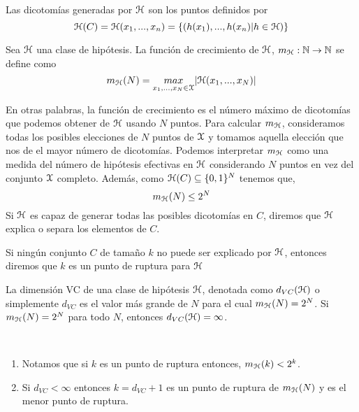      \begin{definicion} 
     Las dicotomías generadas por $\mathcal{H}$ son los puntos definidos por 
     \begin{equation}
     \mathcal{H}(C) = \mathcal{H}(x_1,...,x_n) = \{(h(x_1),...,h(x_n) | h \in \mathcal{H})\}
     \end{equation}
     \end{definicion}
     
     \begin{definicion}
     Sea $\mathcal{H}$ una clase de hipótesis. La función de crecimiento de $\mathcal{H}$, $m_{\mathcal{H}}:\mathbb{N} \to \mathbb{N}$ se define como 
     \begin{equation}
     m_{\mathcal{H}}(N) = \underset{x_1,...,x_N \in \mathcal{X}}{max} |\mathcal{H}(x_1,...,x_N)|
     \end{equation}
     \end{definicion}
     
     En otras palabras, la función de crecimiento es el número máximo de dicotomías que podemos obtener de $\mathcal{H}$ usando $N$ puntos. Para calcular $m_{\mathcal{H}}$, consideramos todas los posibles elecciones de $N$ puntos de $\mathcal{X}$ y tomamos aquella elección que nos de el mayor número de dicotomías. Podemos interpretar $m_{\mathcal{H}}$ como una medida del número de hipótesis efectivas en $\mathcal{H}$ considerando $N$ puntos en vez del conjunto $\mathcal{X}$ completo. Además, como $\mathcal{H}(C) \subseteq \{0,1\}^N$ tenemos que,
     $$m_{\mathcal{H}}(N) \leq 2^N$$
     Si $\mathcal{H}$ es capaz de generar todas las posibles dicotomías en $C$, diremos que $\mathcal{H}$ explica o separa los elementos de $C$. \\
     
    \begin{definicion}
    Si ningún conjunto $C$ de tamaño $k$ no puede ser explicado por $\mathcal{H}$, entonces diremos que $k$ es un punto de ruptura para $\mathcal{H}$
    \end{definicion}
    
    
    \begin{definicion}\label{def:VC}
    La dimensión VC de una clase de hipótesis $\mathcal{H}$, denotada como $d_{VC}(\mathcal{H})$ o simplemente $d_{VC}$ es el valor más grande de $N$ para el cual $m_{\mathcal{H}}(N) = 2^N$. Si $m_{\mathcal{H}}(N) = 2^N$ para todo $N$, entonces $d_{VC}(\mathcal{H}) = \infty$.
    \end{definicion}
    
    \begin{observacion}~\smallskip
    \begin{enumerate}
        \item Notamos que si $k$ es un punto de ruptura entonces, $m_{\mathcal{H}}(k) < 2^k$.
        \item Si $d_{VC} < \infty$ entonces $k = d_{VC} + 1$ es un punto de ruptura de $m_{\mathcal{H}}(N)$ y es el menor punto de ruptura.
    \end{enumerate}
    \end{observacion}
    
